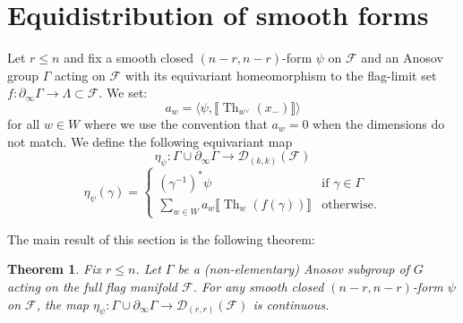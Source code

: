 \documentclass[12pt]{amsbook}%
\newtheorem{thm}{Theorem}[chapter]
\theoremstyle{definition}
\theoremstyle{remark}
\numberwithin{section}{chapter}
\numberwithin{subsection}{section}
\numberwithin{figure}{chapter}
\DeclareMathOperator{\Th}{Th}
\newcommand\intcur[1]{\llbracket #1 \rrbracket}
\def\cF{{\mathscr{F}}}
\def\ga{\gamma}
\begin{document}
{{\section{Equidistribution of smooth forms} \label{section_equivariant_smooth}


Let $r\leqslant n $ and fix a smooth closed $(n-r,n-r)$-form $\psi$ on $\cF$ and an Anosov group $\Gamma$ acting on $\cF$ with its equivariant homeomorphism 
to the flag-limit set $f \colon \partial_\infty \Gamma \to \Lambda \subset \cF$. 
We set: 
\begin{equation}
a_w =  \langle \psi, \intcur{\Th_{w^\vee}(x_-)} \rangle
\end{equation}
for all $w\in W$ where we use the convention that $a_w=0$ when the dimensions do not match.  
We define the following equivariant map  
$$\eta_\psi \colon \Gamma \cup \partial_\infty \Gamma \to \mathcal{D}_{(k,k)}(\cF)$$ 
\begin{equation} \label{eq_eta_smooth}
\eta_\psi(\gamma) = \left  \lbrace \begin{array}{ll}
(\gamma^{-1})^* \psi & \text{if } \ga \in \Gamma \\
\sum_{w \in W}  a_w \llbracket \Th_w(f(\gamma))\rrbracket  & \text{otherwise.}
\end{array} \right .  
\end{equation}

The main result of this section is the following theorem: 


\begin{thm} \label{thm_continuity_equivariant_smooth} Fix $r \leqslant n$. Let $\Gamma$ be a (non-elementary) Anosov subgroup of $G$ acting on the full flag manifold $\cF$.  For any smooth closed  $(n-r,n-r)$-form $\psi$ on $\cF$, the map $\eta_\psi \colon \Gamma \cup \partial_\infty \Gamma \to \mathcal{D}_{(r,r)}(\cF)$ is continuous.  
\end{thm}


}}
\end{document}
